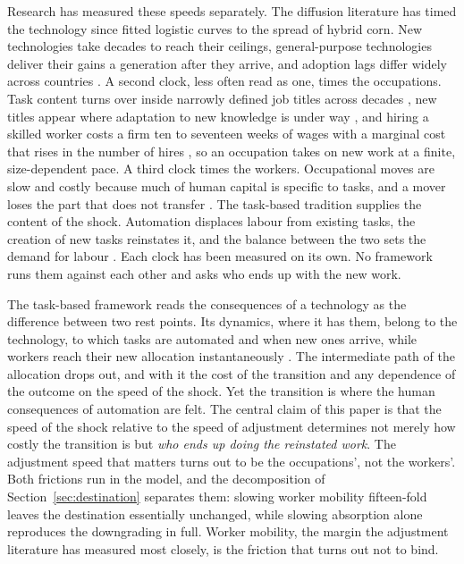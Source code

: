 \documentclass[12pt, a4paper]{article}
\begin{document}
Research has measured these speeds separately. The diffusion literature
has timed the technology since \textcite{griliches1957hybrid} fitted
logistic curves to the spread of hybrid corn. New technologies take
decades to reach their ceilings, general-purpose technologies deliver
their gains a generation after they arrive, and adoption lags differ
widely across countries \parencite{david1990dynamo,
comin2010exploration}. A second clock, less often read as one, times
the occupations. Task content turns over inside narrowly defined job
titles across decades \parencite{atalay2020evolution}, new titles
appear where adaptation to new knowledge is under way
\parencite{lin2011adaptation, autor2024newwork}, and hiring a skilled
worker costs a firm ten to seventeen weeks of wages with a marginal
cost that rises in the number of hires \parencite{blatter2012hiring},
so an occupation takes on new work at a finite, size-dependent pace. A
third clock times the workers. Occupational moves are slow and costly
because much of human capital is
specific to tasks, and a mover loses the part that does not transfer
\parencite{kambourov2009occupational, gathmann2010}. The task-based
tradition supplies the content of the shock. Automation displaces
labour from existing tasks, the creation of new tasks reinstates it,
and the balance between the two sets the demand for labour
\parencite{acemoglu2018race, acemoglu2019automation}. Each clock has
been measured on its own. No framework runs them against each other and
asks who ends up with the new work.

The task-based framework reads the consequences of a technology as the
difference between two rest points. Its dynamics, where it has them,
belong to the technology, to which tasks are automated and when new
ones arrive, while workers reach their new allocation instantaneously
\parencite{acemoglu2019automation}. The intermediate path of the
allocation drops out, and with it the cost of the transition and any
dependence of the outcome on the speed of the shock. Yet the transition
is where the human consequences of automation are felt. The central
claim of this paper is that the speed of the shock relative to the
speed of adjustment determines not merely how costly the transition is
but \emph{who ends up doing the reinstated work}. The adjustment speed
that matters turns out to be the occupations', not the workers'. Both
frictions run in the model, and the decomposition of
Section~\ref{sec:destination} separates them: slowing worker mobility
fifteen-fold leaves the destination essentially unchanged, while
slowing absorption alone reproduces the downgrading in full. Worker
mobility, the margin the adjustment literature has measured most
closely, is the friction that turns out not to bind.
\end{document}
